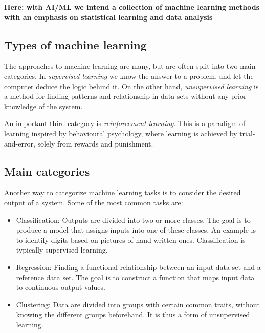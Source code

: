 \documentclass[%
oneside,                 %
final,                   %
10pt]{article}
\begin{document}
\textbf{Here: with AI/ML we intend a collection of machine learning methods with an emphasis on statistical learning and data analysis}

\subsection{Types of machine learning}

\begin{block}{}
The approaches to machine learning are many, but are often split into two main categories. 
In \emph{supervised learning} we know the answer to a problem,
and let the computer deduce the logic behind it. On the other hand, \emph{unsupervised learning}
is a method for finding patterns and relationship in data sets without any prior knowledge of the system.

An important  third category is  \emph{reinforcement learning}. This is a paradigm 
of learning inspired by behavioural psychology, where learning is achieved by trial-and-error, 
solely from rewards and punishment.
\end{block}

\subsection{Main categories}
\begin{block}{}
Another way to categorize machine learning tasks is to consider the desired output of a system.
Some of the most common tasks are:

\begin{itemize}
  \item Classification: Outputs are divided into two or more classes. The goal is to   produce a model that assigns inputs into one of these classes. An example is to identify  digits based on pictures of hand-written ones. Classification is typically supervised learning.

  \item Regression: Finding a functional relationship between an input data set and a reference data set.   The goal is to construct a function that maps input data to continuous output values.

  \item Clustering: Data are divided into groups with certain common traits, without knowing the different groups beforehand.  It is thus a form of unsupervised learning.
\end{itemize}

\noindent
\end{block}
\end{document}
